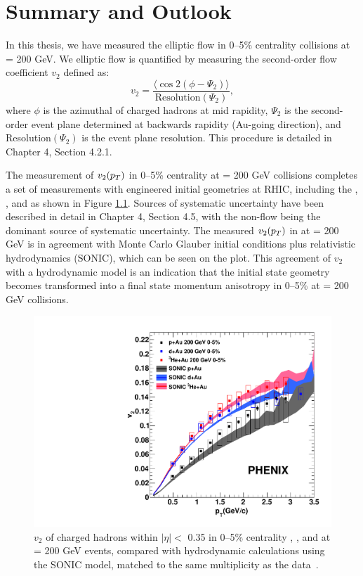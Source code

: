 \chapter{Summary and Outlook}
In this thesis, we have measured the elliptic flow in 0--5\% centrality \pau collisions at \sqsn = 200 GeV. We elliptic flow is quantified by measuring the second-order flow coefficient $v_2$ defined as:
\begin{equation}
v_2 = \frac{\langle\cos 2(\phi-\Psi_2) \rangle}{ \textrm{Resolution}(\Psi_2)},
\end{equation}
where $\phi$ is the azimuthal of charged hadrons at mid rapidity, $\Psi_2$ is the second-order event plane determined at backwards rapidity (Au-going direction), and Resolution$(\Psi_2)$ is the event plane resolution. This procedure is detailed in Chapter 4, Section 4.2.1.

The measurement of $v_2(\mbox{$p_T$})$ in 0--5\% centrality \pau at \sqsn = 200 GeV collisions completes a set of measurements with engineered initial geometries at RHIC, including the \pau, \dau, and \hau as shown in Figure \ref{fig:all_system_hydro_6}. Sources of systematic uncertainty have been described in detail in Chapter 4, Section 4.5, with the non-flow being the dominant source of systematic uncertainty. The measured $v_2(\mbox{$p_T$})$ in \pau at \sqsn = 200 GeV is in agreement with Monte Carlo Glauber initial conditions plus relativistic hydrodynamics (SONIC), which can be seen on the plot. This agreement of $v_2$ with a hydrodynamic model is an indication that the initial state geometry becomes transformed into a final state momentum anisotropy in 0--5\% \pau at \sqsn = 200 GeV collisions. 

\begin{figure}[!ht]
\begin{center}
\includegraphics[width=0.5\linewidth]{figs/three_system_comparison_result.pdf}
\caption{$v_2$ of charged hadrons within $|\eta| <$ 0.35 in 0--5\% centrality \pau, \dau, and \hau at \sqsn = 200 GeV events, compared with hydrodynamic calculations using the SONIC model, matched to the same multiplicity as the data~\cite{Habich:2014jna}.}
\label{fig:all_system_hydro_6}
\end{center}
\end{figure}

